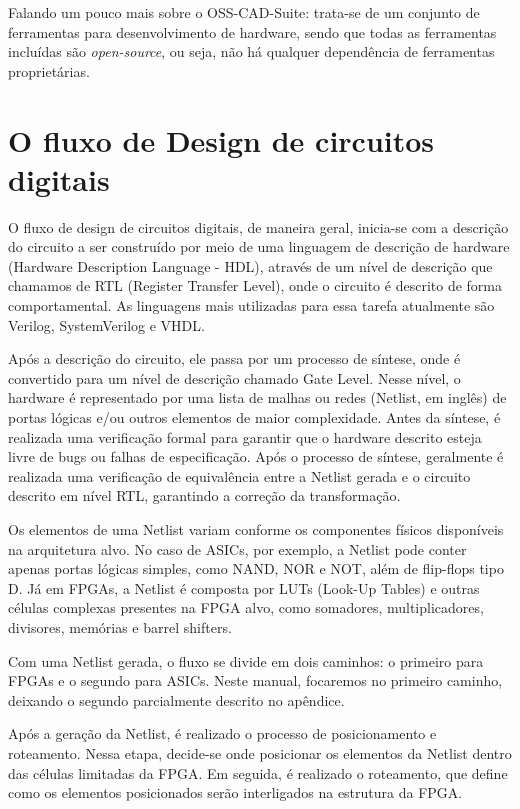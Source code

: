 \documentclass{report}
\begin{document}
Falando um pouco mais sobre o OSS-CAD-Suite: trata-se de um conjunto de ferramentas para desenvolvimento de hardware, sendo que todas as ferramentas incluídas são \textit{open-source}, ou seja, não há qualquer dependência de ferramentas proprietárias.

\section{O fluxo de Design de circuitos digitais}

O fluxo de design de circuitos digitais, de maneira geral, inicia-se com a descrição do circuito a ser construído por meio de uma linguagem de descrição de hardware (Hardware Description Language - HDL), através de um nível de descrição que chamamos de RTL (Register Transfer Level), onde o circuito é descrito de forma comportamental. As linguagens mais utilizadas para essa tarefa atualmente são Verilog, SystemVerilog e VHDL.

Após a descrição do circuito, ele passa por um processo de síntese, onde é convertido para um nível de descrição chamado Gate Level. Nesse nível, o hardware é representado por uma lista de malhas ou redes (Netlist, em inglês) de portas lógicas e/ou outros elementos de maior complexidade. Antes da síntese, é realizada uma verificação formal para garantir que o hardware descrito esteja livre de bugs ou falhas de especificação. Após o processo de síntese, geralmente é realizada uma verificação de equivalência entre a Netlist gerada e o circuito descrito em nível RTL, garantindo a correção da transformação.

Os elementos de uma Netlist variam conforme os componentes físicos disponíveis na arquitetura alvo. No caso de ASICs, por exemplo, a Netlist pode conter apenas portas lógicas simples, como NAND, NOR e NOT, além de flip-flops tipo D. Já em FPGAs, a Netlist é composta por LUTs (Look-Up Tables) e outras células complexas presentes na FPGA alvo, como somadores, multiplicadores, divisores, memórias e barrel shifters.

Com uma Netlist gerada, o fluxo se divide em dois caminhos: o primeiro para FPGAs e o segundo para ASICs. Neste manual, focaremos no primeiro caminho, deixando o segundo parcialmente descrito no apêndice.

Após a geração da Netlist, é realizado o processo de posicionamento e roteamento. Nessa etapa, decide-se onde posicionar os elementos da Netlist dentro das células limitadas da FPGA. Em seguida, é realizado o roteamento, que define como os elementos posicionados serão interligados na estrutura da FPGA.
\end{document}
